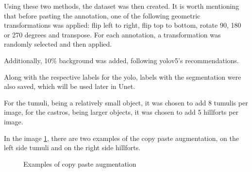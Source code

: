 Using these two methods, the dataset was then created. It is worth mentioning that before pasting the annotation, one of the following geometric transformations was applied: flip left to right, flip top to bottom, rotate 90, 180 or 270 degrees and transpose. For each annotation, a transformation was randomly selected and then applied.

Additionally, 10\% background was added, following yolov5's recommendations.

Along with the respective labels for the yolo, labels with the segmentation were also saved, which will be used later in Unet.

For the tumuli, being a relatively small object, it was chosen to add 8 tumulis per image, for the castros, being larger objects, it was chosen to add 5 hillforts per image.

In the image \ref{Examples of copy paste augmentation}, there are two examples of the copy paste augmentation, on the left side tumuli and on the right side hillforts.
\begin{figure}[H]
    \centering
    \qquad
    \caption{Examples of copy paste augmentation}%
    \label{Examples of copy paste augmentation}
\end{figure}

